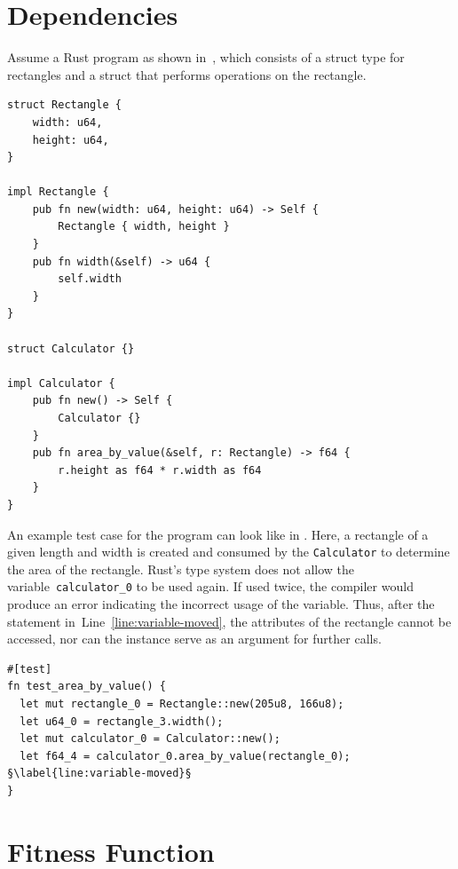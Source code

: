 \documentclass[paper=a4,%
  twoside,%
  BCOR4mm,%
  abstract=true,%
  toc=bibliography,%
  chapterprefix=true,%
  toc=bibliographynumbered,%
  open=right,%
  english,%
  pagesize=pdftex]{scrreprt}
\begin{document}

\section{Dependencies}
\label{sec:dependencies}
Assume a Rust program as shown in~, which consists of a struct type for rectangles and a struct that performs operations on the rectangle.
\begin{lstlisting}[style=boxed, caption={Rectangle data type}, label=lst:example-rust-program]
struct Rectangle {
    width: u64,
    height: u64,
}

impl Rectangle {
    pub fn new(width: u64, height: u64) -> Self {
        Rectangle { width, height }
    }
    pub fn width(&self) -> u64 {
        self.width
    }
}

struct Calculator {}

impl Calculator {
    pub fn new() -> Self {
        Calculator {}
    }
    pub fn area_by_value(&self, r: Rectangle) -> f64 {
        r.height as f64 * r.width as f64
    }
}
\end{lstlisting}

An example test case for the program can look like in . Here, a rectangle of a given length and width is created and consumed by the \texttt{Calculator} to determine the area of the rectangle. Rust's type system does not allow the variable~\texttt{calculator\string_0} to be used again. If used twice, the compiler would produce an error indicating the incorrect usage of the variable. Thus, after the statement in~Line~\ref{line:variable-moved}, the attributes of the rectangle cannot be accessed, nor can the instance serve as an argument for further calls.

\begin{lstlisting}[style=boxed, escapechar=§, caption={An example test case generated for the program in \Cref{lst:example-rust-program}}, label=lst:example-testcase]
#[test]
fn test_area_by_value() {
  let mut rectangle_0 = Rectangle::new(205u8, 166u8);
  let u64_0 = rectangle_3.width();
  let mut calculator_0 = Calculator::new();
  let f64_4 = calculator_0.area_by_value(rectangle_0); §\label{line:variable-moved}§
}
\end{lstlisting}

\section{Fitness Function}
\label{sec:fitness-function}
\end{document}
